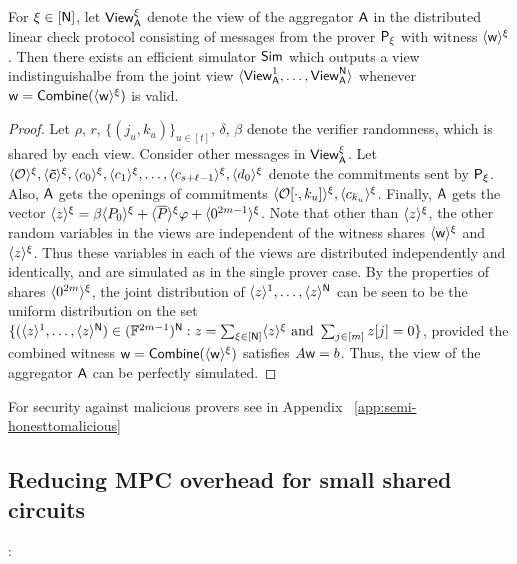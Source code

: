 \begin{lemma}\label{lem:distlincheckzk}
	For $\xi\in [\mathsf{N}]$, let $\mathsf{View}^\xi_{\mathsf{A}}$ denote the view of the aggregator $\mathsf{A}$ in the distributed
	linear check protocol consisting of messages from the prover $\mathsf{P}_\xi$ with
	witness $\langle{\mathsf{w}}\rangle^\xi$. Then there exists an efficient simulator $\mathsf{Sim}$
	which outputs a view indistinguishalbe from the joint view $\langle
	\mathsf{View}^1_{\mathsf{A}},\ldots,\mathsf{View}^{\mathsf{N}}_{\mathsf{A}}\rangle$ whenever
$\mathsf{w}=\mathsf{Combine}(\langle{\mathsf{w}}\rangle^\xi)$ is valid.
\end{lemma}
\begin{proof}
	
	Let  $\rho, \, r, \, \{(j_u,k_u)\}_{u\in[t]}, \, \delta, \, \beta$ denote the verifier
	randomness, which is shared by each view. Consider other messages in
	$\mathsf{View}^\xi_{\mathsf{A}}$. Let $\langle{\mathcal{O}}\rangle^\xi, \langle{\bm{\tilde{c}}}\rangle^\xi, \langle{c_0}\rangle^\xi, \langle{c_1}\rangle^\xi, \ldots, \langle{c_{s+\ell-1}}\rangle^\xi, \langle{d_0}\rangle^\xi$ 
	denote the commitments sent by $\mathsf{P}_\xi$. Also, $\mathsf{A}$ gets the openings
of commitments $\langle{\mathcal{O}[\cdot,k_u]}\rangle^\xi, \langle{c_{k_u}}\rangle^\xi$.
	Finally, $\mathsf{A}$ gets the vector $\langle{z}\rangle^\xi = \beta\langle{P_0}\rangle^\xi + \langle{\overline{P}}\rangle^\xi\varphi + \langle{0^{2m-1}}\rangle^\xi$.
	Note that other than $\langle{z}\rangle^\xi$, the other random variables in the views are
independent of the witness shares $\langle{\mathsf{w}}\rangle^\xi$ and $\langle{z}\rangle^\xi$. Thus these
variables in each of the views are distributed independently and identically,
and are simulated as in the single prover case. By the properties of shares
$\langle{0^{2m}}\rangle^\xi$, the joint distribution of $\langle{z}\rangle^1,\ldots,\langle{z}\rangle^{\mathsf{N}}$ 
can be seen to be the uniform distribution on the set
$\{(\langle{z}\rangle^1,\ldots,\langle{z}\rangle^{\mathsf{N}})\in (\mathbb{F}^{2m-1})^{\mathsf{N}}:
z=\sum_{\xi\in[\mathsf{N}]}\langle{z}\rangle^\xi \text{ and } \sum_{j\in[m]} z[j]=0 \}$, provided
the combined witness $\mathsf{w}=\mathsf{Combine}(\langle{\mathsf{w}}\rangle^\xi)$ satisfies $A\mathsf{w}=b$. 
Thus, the view of the aggregator $\mathsf{A}$ can be perfectly simulated.
\end{proof}

For security against malicious provers see in Appendix ~\ref{app:semi-honesttomalicious}
\subsection{Reducing MPC overhead for small shared circuits}:


